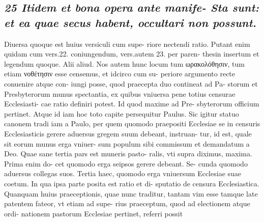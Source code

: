 \documentclass{article}
\begin{document}
\begin{pages}
\subsection*{\textit{25 Itidem et bona opera ante manife- Sta sunt: et ea quae secus habent, occultari non possunt. }}\pstart Diuersa quoque est huius versiculi cum supe- riore nectendi ratio. Putant enim quidam cum vers.22. coniungendum, vers.autem 23. per paren- thesin insertum et legendum quoque. Alii aliud. Nos autem hunc locum tum ωρακολόθησιν, tum etiam νοθέτησιν esse censemus, et idcirco cum su- periore argumento recte conuenire atque con- iungi posse, quod praecepta duo contineat ad Pa- storum et Presbyterorum munus spectantia, ex quibus vniuersa pene totius censurae Ecclesiasti- cae ratio definiri potest. Id quod maxime ad Pre- sbyterorum officium pertinet. Atque id iam hoc toto capite persequitur Paulus. Sic igitur statuo canonem tradi iam a Paulo, per quem quomodo praepositi Ecclesiae se in censuris Ecclesiasticis gerere aduersus gregem suum debeant, instruan- tur, id est, quale sit eorum munus erga vniuer- sum populum sibi commissum et demandatum a Deo. Quae sane tertia pars est muneris pasto- ralis, vti supra diximus, maxima. Prima enim do- cet quomodo erga seipsos gerere debeant. Se- cunda quomodo aduersus collegas suos. Tertia haec, quomodo erga vniuersum Ecclesiae suae coetum. In qua ipsa parte posita est ratio et di- sputatio de censura Ecclesiastica. Quanquam huius praeceptionis, quae nunc traditur, tantam vim esse tamque late patentem fateor, vt etiam ad supe- rius praeceptum, quod ad electionem atque ordi- nationem pastorum Ecclesiae pertinet, referri possit  \pend

\end{pages}
\end{document}

